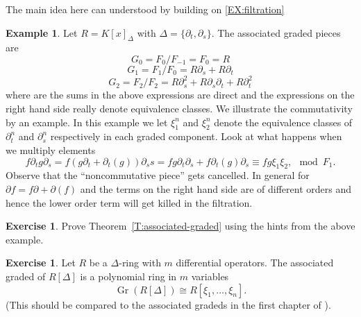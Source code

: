 \documentclass[12pt]{book}
\numberwithin{equation}{section}
\theoremstyle{definition}
\newtheorem{example}[theorem]{Example}
\newtheorem{exercise}[theorem]{Exercise}
\theoremstyle{remark}
\newcommand{\Gr}{\operatorname{Gr}}
\begin{document}
The main idea here can understood by building on \ref{EX:filtration}
\begin{example}
	Let $R = K[x]_{\Delta}$ with $\Delta = \lbrace \partial_t,\partial_s\rbrace$.
	The associated graded pieces are 
	$$ G_0 = F_0/F_{-1} = F_0 = R $$
	$$ G_1 = F_1/F_0 = R\partial_s + R\partial_t $$
	$$ G_2 = F_2/F_2 = R\partial_s^2 + R\partial_s \partial_t + R \partial_t^2 $$
	where are the sums in the above expressions are direct and the expressions on the right hand side really denote equivalence classes. 
	We illustrate the commutativity by an example. 
	In this example we let $\xi_1^n$ and $\xi_2^n$ denote the equivalence classes of $\partial_t^n$ and $\partial_s^n$ respectively in each graded component.
	Look at what happens when we multiply elements
	$$ f\partial_t  g\partial_s = f(g\partial_t + \partial_t(g))\partial_ss = fg \partial_t\partial_s + f\partial_t(g) \partial_s \equiv fg \xi_1 \xi_2, \mod F_1.$$
	Observe that the ``noncommutative piece'' gets cancelled.
	In general for $\partial f = f \partial+ \partial(f)$ and the terms on the right hand side are of different orders and hence the lower order term will get killed in the filtration. 
\end{example}

\begin{exercise}
	Prove Theorem~\ref{T:associated-graded} using the hints from the above example.
\end{exercise}

\iffalse
\begin{example}[Trivial Filtration]
	For any ring $R$ one case define a filtration 
	$$F_rR = \begin{cases} 
	R, & r = 0\\
	0, & r<0
	\end{cases}.$$
	The associated graded is the same 
	$$\Gr_r(R) = \begin{cases} 
	R, & r = 0\\
	0, & r<0
	\end{cases}.$$
\end{example}
\fi

\begin{exercise}
	Let $R$ be a $\Delta$-ring with $m$ differential operators. 
	The associated graded of $R[\Delta]$ is a polynomial ring in $m$ variables
	$$\Gr(R[\Delta]) \cong R[\xi_1,\ldots,\xi_n].$$
	(This should be compared to the associated gradeds in the first chapter of \cite{Saito2000}).
\end{exercise}
\end{document}
